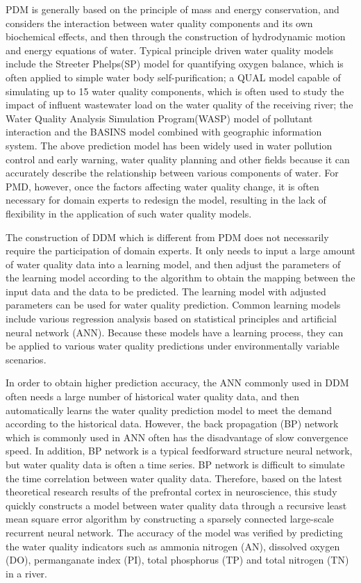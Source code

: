 \documentclass[runningheads]{llncs}
\begin{document}
PDM is generally based on the principle of mass and energy conservation, 
and considers the interaction between water quality components and its
own biochemical effects, and then through the construction of hydrodynamic 
motion and energy equations of water\cite{RN5,RN6}. Typical principle driven water 
quality models include the Streeter Phelps(SP) model for quantifying oxygen 
balance\cite{RN7}, which is often applied to simple water body self-purification; 
a QUAL model capable of simulating up to 15 water quality components\cite{RN5}, 
which is often used to study the impact of influent wastewater load on the water 
quality of the receiving river; the Water Quality Analysis Simulation Program(WASP) 
model of pollutant interaction\cite{RN6} and the BASINS model combined with geographic 
information system\cite{RN5,RN8}. The above prediction model has been widely used 
in water pollution control and early warning, water quality planning and 
other fields because it can accurately describe the relationship between 
various components of water. For PMD, however, once the factors affecting 
water quality change, it is often necessary for domain experts to redesign 
the model, resulting in the lack of flexibility in the application of 
such water quality models.

The construction of DDM which is different from PDM does not necessarily 
require the participation of domain experts. It only needs to input 
a large amount of water quality data into a learning model, and then 
adjust the parameters of the learning model according to the algorithm 
to obtain the mapping between the input data and the data to 
be predicted. The learning model with adjusted parameters can be 
used for water quality prediction. Common learning models include various 
regression analysis based on statistical principles\cite{RN9,RN10,RN11,RN12} and artificial
neural network (ANN)\cite{RN13,RN14,RN15,RN16,RN17,RN18}. Because these models have a learning process, they can be applied to various water quality predictions under environmentally variable scenarios.

In order to obtain higher prediction accuracy, the ANN 
commonly used in DDM often needs a large number of historical 
water quality data, and then automatically learns the water 
quality prediction model to meet the demand according 
to the historical data. However, the back propagation (BP) 
network which is commonly used in ANN often has the 
disadvantage of slow convergence speed. In addition, BP network is 
a typical feedforward structure neural network, but water quality data 
is often a time series\cite{RN19}. BP network is difficult to simulate the time 
correlation between water quality data. Therefore, based on the latest theoretical research results of the prefrontal cortex in neuroscience\cite{RN20,RN21}, this study quickly constructs a model between water quality data through a recursive least mean square error algorithm by constructing a sparsely connected large-scale recurrent neural network. The accuracy of the model was verified by predicting the water quality 
 indicators such as ammonia nitrogen (AN), dissolved oxygen (DO), permanganate index (PI), 
 total phosphorus (TP) and total nitrogen (TN) in a river.
\end{document}
